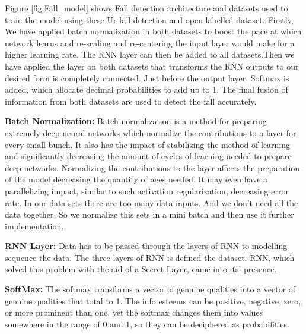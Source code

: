 \vspace{0.5cm}
Figure \ref{fig:Fall_model} shows Fall detection architecture and datasets used to train the model using these Ur fall detection and open labelled dataset. Firstly, We have applied batch normalization in both datasets 
to boost the pace at which network learns and re-scaling and re-centering the input layer would make for a higher learning rate. The RNN layer can then be added to all datasets.Then we have applied the layer on both datasets that transforms the RNN outputs to our desired form is completely connected. Just before the output layer, Softmax is added, which allocate decimal probabilities to add up to 1. The final fusion of information from both datasets are used to detect the fall accurately.






\vspace{0.5cm}
\textbf{Batch Normalization: }Batch normalization is a method for preparing extremely deep neural networks which normalize the contributions to a layer for every small bunch. It also has the impact of stabilizing the method of learning and significantly decreasing the amount of cycles of learning needed to prepare deep networks. Normalizing the contributions to the layer affects the preparation of the model decreasing the quantity of ages needed. It may even have a parallelizing impact, similar to such activation regularization, decreasing error rate. In our data sets there are too many data inputs. And we don’t need all the data together. So we normalize this sets in a mini batch and then use it further implementation.

\vspace{0.5cm}
\textbf{RNN Layer: } Data has to be passed through the layers of RNN to modelling sequence the data. The three layers of RNN is defined the dataset. RNN, which solved this problem with the aid of a Secret Layer, came into its' presence.

\vspace{0.5cm}
\textbf{SoftMax: }The softmax transforms a vector of genuine qualities into a vector of genuine qualities that total to 1. The info esteems can be positive, negative, zero, or more prominent than one, yet the softmax changes them into values somewhere in the range of 0 and 1, so they can be deciphered as probabilities.


